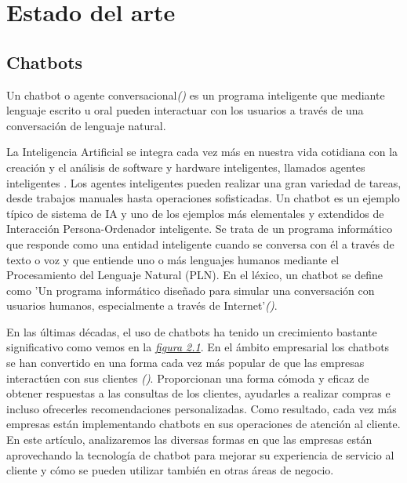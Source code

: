 \chapter{Estado del arte}

\section{Chatbots}

Un chatbot o agente conversacional\textit{(\cite{chatbots2020})} es un programa inteligente que mediante lenguaje escrito u oral pueden interactuar con los usuarios a través de una conversación de lenguaje natural. 

La Inteligencia Artificial se integra cada vez más en nuestra vida cotidiana con la creación y el análisis de software y hardware inteligentes, llamados agentes inteligentes . Los agentes inteligentes pueden realizar una gran variedad de tareas, desde trabajos manuales hasta operaciones sofisticadas. Un chatbot es un ejemplo típico de sistema de IA y uno de los ejemplos más elementales y extendidos de Interacción Persona-Ordenador inteligente. Se trata de un programa informático que responde como una entidad inteligente cuando se conversa con él a través de texto o voz y que entiende uno o más lenguajes humanos mediante el Procesamiento del Lenguaje Natural (PLN). En el léxico, un chatbot se define como 'Un programa informático diseñado para simular una conversación con usuarios humanos, especialmente a través de Internet'\textit{(\cite{chatbotdef})}.

En las últimas décadas, el uso de chatbots ha tenido un crecimiento bastante significativo como vemos en la  \textit{\hyperref[fig:crecimiento]{figura 2.1}}. En el ámbito empresarial los chatbots se han convertido en una forma cada vez más popular de que las empresas interactúen con sus clientes \textit{(\cite{techinnovation})}. Proporcionan una forma cómoda y eficaz de obtener respuestas a las consultas de los clientes, ayudarles a realizar compras e incluso ofrecerles recomendaciones personalizadas. Como resultado, cada vez más empresas están implementando chatbots en sus operaciones de atención al cliente. En este artículo, analizaremos las diversas formas en que las empresas están aprovechando la tecnología de chatbot para mejorar su experiencia de servicio al cliente y cómo se pueden utilizar también en otras áreas de negocio.

